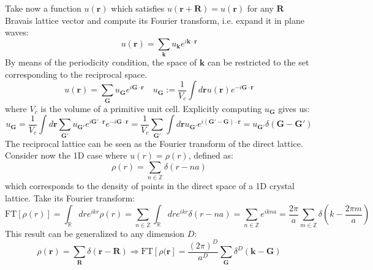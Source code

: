 \documentclass[10.75pt,a4paper,openright,bottom=2cm]{article}
\renewcommand{\Vec}[1]{\boldsymbol{#1}}
\begin{document}
Take now a function $u(\Vec{r})$ which satisfies $u(\Vec{r}+\Vec{R})=u(\Vec{r})$ for any $\Vec{R}$ Bravais lattice vector and compute its Fourier transform, i.e. expand it in plane waves:
\[
u(\Vec{r})=\sum_{\Vec{k}}u_{\Vec{k}}e^{i\Vec{k}\cdot\Vec{r}}
\]
By means of the periodicity condition, the space of $\Vec{k}$ can be restricted to the set corresponding to the reciprocal space.
\[
u(\Vec{r})=\sum_{\Vec{G}}u_{\Vec{G}}e^{i\Vec{G}\cdot\Vec{r}} \quad u_{\Vec{G}}:=\frac{1}{V_c}\int d\Vec{r}u(\Vec{r})e^{-i\Vec{G}\cdot\Vec{r}}
\]
where $V_c$ is the volume of a primitive unit cell. Explicitly computing $u_{\Vec{G}}$ gives us:
\[
u_{\Vec{G}}=\frac{1}{V_c}\int d\Vec{r}\sum_{\Vec{G'}}u_{\Vec{G'}}e^{i\Vec{G'}\cdot\Vec{r}}e^{-i\Vec{G}\cdot\Vec{r}}=\frac{1}{V_c}\sum_{\Vec{G'}}\int d\Vec{r}u_{\Vec{G'}}e^{i(\Vec{G'}-\Vec{G})\cdot\Vec{r}}=u_{\Vec{G'}}\delta(\Vec{G}-\Vec{G'})
\]
The reciprocal lattice can be seen as the Fourier transform of the direct lattice. Consider now the 1D case where $u(r)=\rho(r)$, defined as:
\[
\rho(r)=\sum_{n\in\mathbb{Z}}\delta(r-na)
\]
which corresponds to the density of points in the direct space of a 1D crystal lattice. Take its Fourier transform:
\[
\text{FT}[\rho(r)]=\int_{\mathbb{R}}dre^{ikr}\rho(r)=\sum_{n\in\mathbb{Z}}\int_\mathbb{R}dre^{ikr}\delta(r-na)=\sum_{n\in\mathbb{Z}}e^{ikna}=\frac{2\pi}{a}\sum_{m\in\mathbb{Z}}\delta\left(k-\frac{2\pi m}{a}\right)
\]
This result can be generalized to any dimension $D$:
\[
\rho(\Vec{r})=\sum_{\Vec{R}}\delta(\Vec{r}-\Vec{R})\Rightarrow\text{FT}[\rho(\Vec{r}]=\frac{(2\pi)^D}{a^D}\sum_{\Vec{G}}\delta^D(\Vec{k}-\Vec{G})
\]
\newpage
\end{document}
